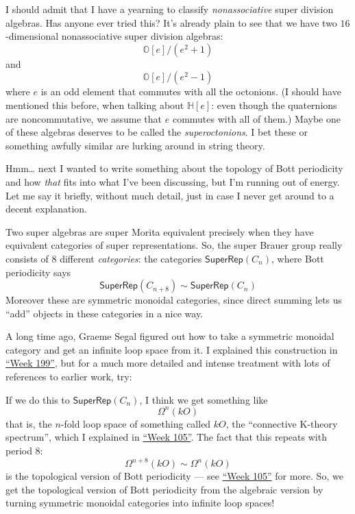 \documentclass{article}
\def\tightlist{}
\renewcommand{\texttt}[1]{%
  \begingroup
  \ttfamily
  \begingroup\lccode`~=`/\lowercase{\endgroup\def~}{/\discretionary{}{}{}}%
  \begingroup\lccode`~=`[\lowercase{\endgroup\def~}{[\discretionary{}{}{}}%
  \begingroup\lccode`~=`.\lowercase{\endgroup\def~}{.\discretionary{}{}{}}%
  \catcode`/=\active\catcode`[=\active\catcode`.=\active
  \scantokens{#1\noexpand}%
  \endgroup
}
\begin{document}
I should admit that I have a yearning to classify \emph{nonassociative}
super division algebras. Has anyone ever tried this? It's already plain
to see that we have two \(16\)-dimensional nonassociative super division
algebras: \[\mathbb{O}[e]/(e^2 + 1)\] and \[\mathbb{O}[e]/(e^2 - 1)\]
where \(e\) is an odd element that commutes with all the octonions. (I
should have mentioned this before, when talking about \(\mathbb{H}[e]\):
even though the quaternions are noncommutative, we assume that \(e\)
commutes with all of them.) Maybe one of these algebras deserves to be
called the \emph{superoctonions}. I bet these or something awfully
similar are lurking around in string theory.

Hmm\ldots{} next I wanted to write something about the topology of Bott
periodicity and how \emph{that} fits into what I've been discussing, but
I'm running out of energy. Let me say it briefly, without much detail,
just in case I never get around to a decent explanation.

Two super algebras are super Morita equivalent precisely when they have
equivalent categories of super representations. So, the super Brauer
group really consists of 8 different \emph{categories}: the categories
\(\mathsf{SuperRep}(C_n)\), where Bott periodicity says
\[\mathsf{SuperRep}(C_{n+8}) \sim \mathsf{SuperRep}(C_n)\] Moreover
these are symmetric monoidal categories, since direct summing lets us
``add'' objects in these categories in a nice way.

A long time ago, Graeme Segal figured out how to take a symmetric
monoidal category and get an infinite loop space from it. I explained
this construction in \protect\hyperlink{week199}{``Week 199''}, but for
a much more detailed and intense treatment with lots of references to
earlier work, try:


If we do this to \(\mathsf{SuperRep}(C_n)\), I think we get something
like \[\Omega^n(kO)\] that is, the \(n\)-fold loop space of something
called \(kO\), the ``connective K-theory spectrum'', which I explained
in \protect\hyperlink{week105}{``Week 105''}. The fact that this repeats
with period 8: \[\Omega^{n+8}(kO) \sim \Omega^n(kO)\] is the topological
version of Bott periodicity --- see \protect\hyperlink{week105}{``Week
105''} for more. So, we get the topological version of Bott periodicity
from the algebraic version by turning symmetric monoidal categories into
infinite loop spaces!
\end{document}
